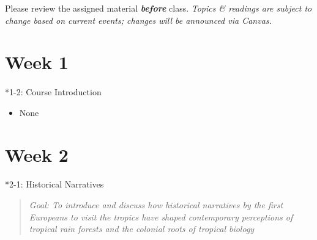 \documentclass[
  10pt,
  letterpaper,
  oneside,
  open=any]{scrbook}
\makeatletter
\let\oldparagraph\paragraph
\renewcommand{\paragraph}{
    \@ifstar
      \xxxParagraphStar
      \xxxParagraphNoStar
  }
\newcommand{\xxxParagraphStar}[1]{\oldparagraph*{#1}\mbox{}}
\newcommand{\xxxParagraphNoStar}[1]{\oldparagraph{#1}\mbox{}}
\providecommand{\tightlist}{%
  \setlength{\itemsep}{0pt}\setlength{\parskip}{0pt}}
\makeatother
\begin{document}
\begin{tcolorbox}[enhanced jigsaw, bottomtitle=1mm, colback=white, colbacktitle=quarto-callout-important-color!10!white, arc=.35mm, leftrule=.75mm, coltitle=black, colframe=quarto-callout-important-color-frame, bottomrule=.15mm, breakable, toprule=.15mm, rightrule=.15mm, titlerule=0mm, title=\textcolor{quarto-callout-important-color}{\faExclamation}\hspace{0.5em}{Important}, toptitle=1mm, left=2mm, opacitybacktitle=0.6, opacityback=0]

Please review the assigned material \textbf{\emph{before}} class.
\emph{Topics \& readings are subject to change based on current events;
changes will be announced via Canvas.}

\end{tcolorbox}

\section*{Week 1}\label{week-1}


\paragraph*{1-2: Course Introduction}\label{course-introduction}

\begin{itemize}
\tightlist
\item
  None
\end{itemize}

\section*{Week 2}\label{week-2}


\paragraph*{2-1: Historical Narratives}\label{historical-narratives}

\begin{quote}
\emph{Goal: To introduce and discuss how historical narratives by the
first Europeans to visit the tropics have shaped contemporary
perceptions of tropical rain forests and the colonial roots of tropical
biology}
\end{quote}
\end{document}
